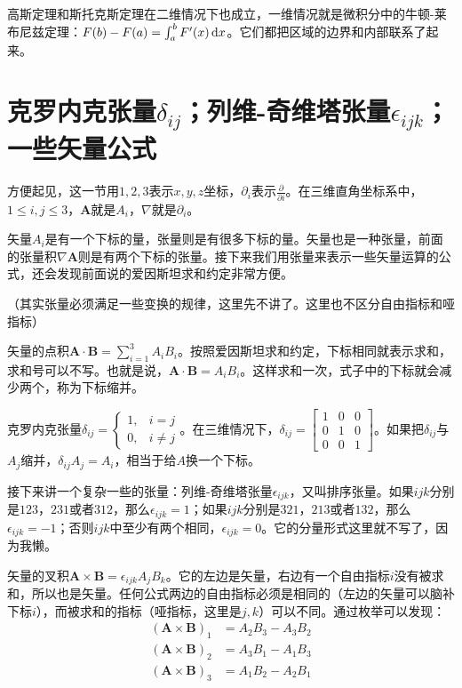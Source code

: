 高斯定理和斯托克斯定理在二维情况下也成立，一维情况就是微积分中的牛顿-莱布尼兹定理：$F(b)-F(a)=\int_a^b F'(x) \mathop{}\!\mathrm{d} x$。它们都把区域的边界和内部联系了起来。
\section{克罗内克张量$\delta_{i j}$；列维-奇维塔张量$\epsilon_{i j k}$；一些矢量公式}
方便起见，这一节用$1,2,3$表示$x,y,z$坐标，$\partial_i$表示$\frac{\partial}{\partial i}$。在三维直角坐标系中，$1 \le i,j \le 3$，$\mathbf{A}$就是$A_i$，$\nabla$就是$\partial_i$。

矢量$A_i$是有一个下标的量，张量则是有很多下标的量。矢量也是一种张量，前面的张量积$\nabla \mathbf{A}$则是有两个下标的张量。接下来我们用张量来表示一些矢量运算的公式，还会发现前面说的爱因斯坦求和约定非常方便。

（其实张量必须满足一些变换的规律，这里先不讲了。这里也不区分自由指标和哑指标）

矢量的点积$\mathbf{A} \cdot \mathbf{B}=\sum_{i=1}^3 A_i B_i$。按照爱因斯坦求和约定，下标相同就表示求和，求和号可以不写。也就是说，$\mathbf{A} \cdot \mathbf{B}=A_i B_i$。这样求和一次，式子中的下标就会减少两个，称为下标缩并。

克罗内克张量$\delta_{i j}=\begin{cases} 1, &i=j \\ 0, &i \neq j \end{cases}$。在三维情况下，$\delta_{i j}=\begin{bmatrix}
1 & 0 & 0 \\
0 & 1 & 0 \\
0 & 0 & 1
\end{bmatrix}$。如果把$\delta_{i j}$与$A_j$缩并，$\delta_{i j} A_j=A_i$，相当于给$A$换一个下标。

接下来讲一个复杂一些的张量：列维-奇维塔张量$\epsilon_{i j k}$，又叫排序张量。如果$ijk$分别是$123$，$231$或者$312$，那么$\epsilon_{i j k}=1$；如果$ijk$分别是$321$，$213$或者$132$，那么$\epsilon_{i j k}=-1$；否则$ijk$中至少有两个相同，$\epsilon_{i j k}=0$。它的分量形式这里就不写了，因为我懒。

矢量的叉积$\mathbf{A} \times \mathbf{B}=\epsilon_{i j k} A_j B_k$。它的左边是矢量，右边有一个自由指标$i$没有被求和，所以也是矢量。任何公式两边的自由指标必须是相同的（左边的矢量可以脑补下标$i$），而被求和的指标（哑指标，这里是$j,k$）可以不同。通过枚举可以发现：
\begin{align*}
(\mathbf{A} \times \mathbf{B})_1&=A_2 B_3-A_3 B_2 \\
(\mathbf{A} \times \mathbf{B})_2&=A_3 B_1-A_1 B_3 \\
(\mathbf{A} \times \mathbf{B})_3&=A_1 B_2-A_2 B_1
\end{align*}

